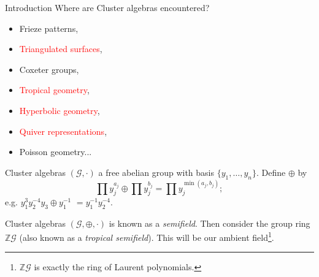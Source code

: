 \documentclass{beamer}
\begin{document}
\begin{frame}{Introduction}
    Where are Cluster algebras encountered?
    \begin{itemize}
        \item Frieze patterns,
        \item \textcolor{red}{Triangulated surfaces},
        \item Coxeter groups,
        \item \textcolor{red}{Tropical geometry},
        \item \textcolor{red}{Hyperbolic geometry},
        \item \textcolor{red}{Quiver representations},
        \item Poisson geometry...
    \end{itemize}
\end{frame}

\begin{frame}{Cluster algebras}
    $(\mathcal{G}, \cdot)$ a free abelian group with basis $\{y_1,\dots,y_n\}$.
    \pause
    Define $\oplus$ by 
    \begin{equation*}
        \prod y_j^{a_j}\oplus\prod y_j^{b_j} = \prod y_j^{\min(a_j,b_j)};
    \end{equation*}
    \pause
    e.g. $y_1^3y_2^{-4}y_3\oplus y_1^{-1}$ $= y_1^{-1}y_2^{-4}$.
\end{frame}
    
\begin{frame}{Cluster algebras}
    $(\mathcal{G}, \oplus, \cdot)$ is known as a \emph{semifield}. Then consider the group ring $\mathbb{Z}\mathcal{G}$ (also known as a \emph{tropical semifield}). This will be our ambient field\footnote{$\mathbb{Z}\mathcal{G}$ is exactly the ring of Laurent polynomials.}.
\end{frame}

    
\end{document}
